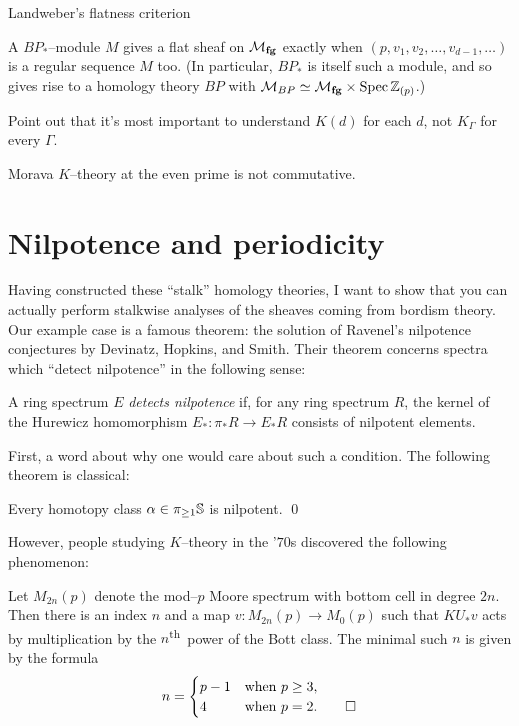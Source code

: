 Landweber's flatness criterion

A $BP_*$--module $M$ gives a flat sheaf on $\moduli{fg}$ exactly when $(p, v_1, v_2, \ldots, v_{d-1}, \ldots)$ is a regular sequence $M$ too.  (In particular, $BP_*$ is itself such a module, and so gives rise to a homology theory $BP$ with $\context{BP} \simeq \moduli{fg} \times \Spec \Z_{(p)}$.)


Point out that it's most important to understand $K(d)$ for each $d$, not $K_\Gamma$ for every $\Gamma$.

\begin{remark}
Morava $K$--theory at the even prime is not commutative.
\end{remark}







\section{Nilpotence and periodicity}

Having constructed these ``stalk'' homology theories, I want to show that you can actually perform stalkwise analyses of the sheaves coming from bordism theory.  Our example case is a famous theorem: the solution of Ravenel's nilpotence conjectures by Devinatz, Hopkins, and Smith.  Their theorem concerns spectra which ``detect nilpotence'' in the following sense:

\begin{definition}
A ring spectrum $E$ \textit{detects nilpotence} if, for any ring spectrum $R$, the kernel of the Hurewicz homomorphism $E_*: \pi_* R \to E_* R$ consists of nilpotent elements.
\end{definition}

First, a word about why one would care about such a condition.  The following theorem is classical:
\begin{theorem}[Nishida]
Every homotopy class $\alpha \in \pi_{\ge 1} \S$ is nilpotent. \qed
\end{theorem}

\noindent However, people studying $K$--theory in the '$70$s discovered the following phenomenon:

\begin{theorem}[Adams]
Let $M_{2n}(p)$ denote the mod--$p$ Moore spectrum with bottom cell in degree $2n$.  Then there is an index $n$ and a map $v: M_{2n}(p) \to M_0(p)$ such that $KU_* v$ acts by multiplication by the $n$\textsuperscript{th}\, power of the Bott class.  The minimal such $n$ is given by the formula \[n = \begin{cases} p-1 & \text{when $p \ge 3$}, \\ 4 & \text{when $p = 2$}. \qed \end{cases}\]
\end{theorem}

